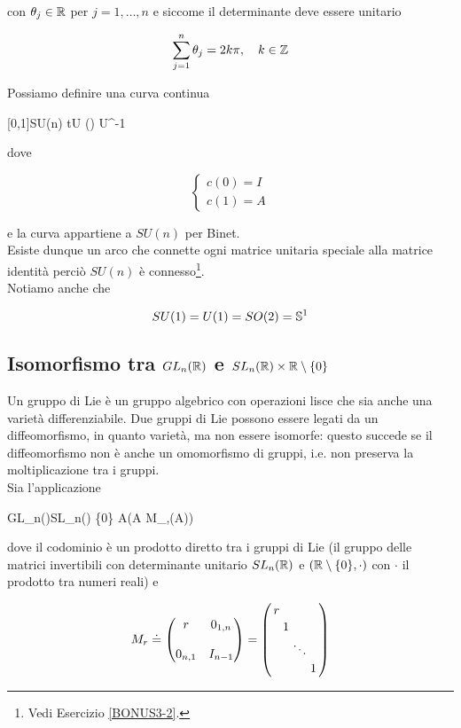 con $ \theta_{j} \in \R $ per $ j=1,\dots,n $ e siccome il determinante deve essere unitario

\begin{equation}
	\sum_{j=1}^{n} \theta_{j} = 2 k \pi \qcomma k \in \Z
\end{equation}

Possiamo definire una curva continua

%
	{[0,1]}{SU(n)}%
	{t}{U \smqty() U^{-1}}

dove

\begin{equation}
	\begin{cases}
		c(0) = I\\
		c(1) = A
	\end{cases}
\end{equation}

e la curva appartiene a $ SU(n) $ per Binet.\\
Esiste dunque un arco che connette ogni matrice unitaria speciale alla matrice identità perciò $ SU(n) $ è connesso\footnote{%
	Vedi Esercizio \ref{BONUS3-2}.%
}.\\
Notiamo anche che

\begin{equation}
	SU(1) = U(1) = SO(2) = \S^{1}
\end{equation}

\subsection{Isomorfismo tra $ GL_{n}(\R) $ e $ SL_{n}(\R) \times \R \setminus \{0\} $}

Un gruppo di Lie è un gruppo algebrico con operazioni lisce che sia anche una varietà differenziabile. Due gruppi di Lie possono essere legati da un diffeomorfismo, in quanto varietà, ma non essere isomorfe: questo succede se il diffeomorfismo non è anche un omomorfismo di gruppi, i.e. non preserva la moltiplicazione tra i gruppi.\\
Sia l'applicazione

%
	{GL_{n}(\R)}{SL_{n}(\R) \times \R \setminus \{0\}}%
	{A}{(A M_{},\det(A))}

dove il codominio è un prodotto diretto tra i gruppi di Lie (il gruppo delle matrici invertibili con determinante unitario $ SL_{n}(\R) $ e $ (\R \setminus \{0\},\cdot) $ con $ \cdot $ il prodotto tra numeri reali) e

\begin{equation}
	M_{r} \doteq %
	\mqty( r & 0_{1,n} \\\\ 0_{n,1} & I_{n-1} ) = %
	\smqty(\dmat{ r, 1, \ddots, 1 })
\end{equation}

